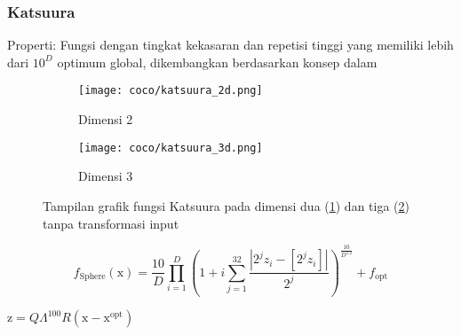 \subsubsection*{Katsuura}
\noindent Properti:
Fungsi dengan tingkat kekasaran dan repetisi tinggi yang memiliki lebih dari $10^D$ optimum global, dikembangkan berdasarkan konsep dalam \citep{Katsuura:1991:CND}
\begin{figure}[H]
	\centering
	\begin{subfigure}[b]{0.4\textwidth}
		\centering
		\texttt{[image: coco/katsuura\_2d.png]}
		\caption{Dimensi 2}
		\label{fig:katsuura_coco_2d}
	\end{subfigure}
	\hfill
	\begin{subfigure}[b]{0.4\textwidth}
		\centering
		\texttt{[image: coco/katsuura\_3d.png]}
		\caption{Dimensi 3}
		\label{fig:katsuura_coco_3d}
	\end{subfigure}
	\caption{Tampilan grafik fungsi Katsuura pada dimensi dua (\cref{fig:katsuura_coco_2d}) dan tiga (\cref{fig:katsuura_coco_3d}) tanpa transformasi input}
	\label{fig:katsuura_coco}
\end{figure}
\begin{equation}
  f_{\text{Sphere}}(\mathrm{x})=\frac{10}{D}\prod_{i=1}^{D}(1+i\sum_{j=1}^{32}\frac{|2^jz_i-[2^jz_i]|}{2^j})^{\frac{10}{D^{1.2}}}+f_{\text{opt}}
\end{equation}
\begin{packed_item}
    \item $\mathrm{z}=Q\Lambda^{100}R(\mathrm{x}-\mathrm{x}^{\text{opt}})$
\end{packed_item}

